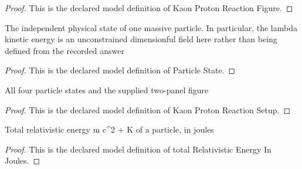 \begin{proof}
  This is the declared model definition of Kaon Proton Reaction Figure.
\end{proof}
\begin{definition}
  \label{def:physics:phyx-mini-0554:phyxminiproblems-problemphyxmini0554-particlestate}
  The independent physical state of one massive particle. In particular, the lambda kinetic energy is an unconstrained dimensionful field here rather than being defined from the recorded answer
\end{definition}
\begin{proof}
  This is the declared model definition of Particle State.
\end{proof}
\begin{definition}
  \label{def:physics:phyx-mini-0554:phyxminiproblems-problemphyxmini0554-kaonprotonreactionsetup}
  All four particle states and the supplied two-panel figure
\end{definition}
\begin{proof}
  This is the declared model definition of Kaon Proton Reaction Setup.
\end{proof}
\begin{definition}
  \label{def:physics:phyx-mini-0554:phyxminiproblems-problemphyxmini0554-totalrelativisticenergyinjoules}
  Total relativistic energy m c\textasciicircum{}2 + K of a particle, in joules
\end{definition}
\begin{proof}
  This is the declared model definition of total Relativistic Energy In Joules.
\end{proof}
